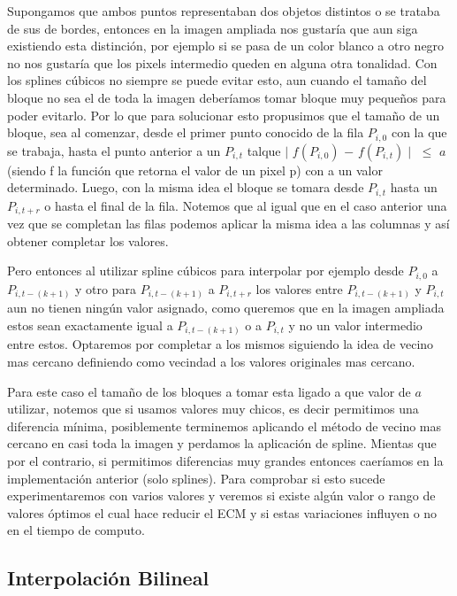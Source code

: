 \documentclass[a4paper]{article}
\newcounter{col}
\begin{document}
Supongamos que ambos puntos representaban dos objetos distintos o se trataba de sus de bordes, entonces en la imagen ampliada nos gustaría que aun siga existiendo esta distinción, por ejemplo si se pasa de un color blanco a otro negro no nos gustaría que los pixels intermedio queden en alguna otra tonalidad. Con los splines cúbicos no siempre se puede evitar esto, aun cuando el tamaño del bloque no sea el de toda la imagen deberíamos tomar bloque muy pequeños para poder evitarlo. Por lo que para solucionar esto propusimos que el tamaño de un bloque, sea al comenzar, desde el primer punto conocido de la fila $P_{i,0}$ con la que se trabaja,  hasta el punto anterior a un $P_{i, t}$ talque  $\mid $  $f(P_{i,0})$  $- $ $f(P_{i, t}) \mid$ $\leqslant$ $a$ (siendo f la función que retorna el valor de un pixel p) con a un valor determinado. Luego, con la misma idea el bloque se tomara desde $P_{i, t}$ hasta un $P_{i, t+r}$ o hasta el final de la fila. Notemos que al igual que en el caso anterior una vez que se completan las filas podemos aplicar la misma idea a las columnas y así obtener completar los valores. 

Pero entonces al utilizar spline cúbicos para interpolar por ejemplo desde $P_{i,0}$ a $P_{i, t - (k+1)}$ y otro para $P_{i, t - (k+1)}$ a $P_{i, t+r}$ los valores entre $P_{i, t - (k+1)}$ y $P_{i, t}$ aun no tienen ningún valor asignado, como queremos que en la imagen ampliada estos sean exactamente igual a $P_{i, t - (k+1)}$ o a $P_{i, t}$ y no un valor intermedio entre estos. Optaremos por completar a los mismos siguiendo la idea de vecino mas cercano definiendo como vecindad a los valores originales mas cercano.

Para este caso el tamaño de los bloques a tomar esta ligado a que valor de $a$ utilizar, notemos que si usamos valores muy chicos, es decir permitimos una diferencia mínima, posiblemente terminemos aplicando el método de vecino mas cercano en casi toda la imagen y perdamos la aplicación de spline. Mientas que por el contrario, si permitimos diferencias muy grandes entonces caeríamos en la implementación anterior (solo splines). Para comprobar si esto sucede experimentaremos con varios valores y veremos si existe algún valor o rango de valores óptimos el cual hace reducir el ECM y si estas variaciones influyen o no en el tiempo de computo.
\subsection{Interpolación Bilineal}
\end{document}
